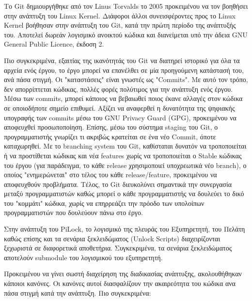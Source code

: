 		Το Git δημιουργήθηκε από τον Linus Torvalds το 2005 προκειμένου να τον βοηθήσει στην ανάπτυξη του Linux Kernel\textsuperscript{\cite{Git_History}}. Διάφοροι άλλοι συνεισφέροντες προς το Linux Kernel βοήθησαν στην ανάπτυξη του Git, κατά την πρώτη περίοδο της ανάπτυξής του. Αποτελεί δωρεάν λογισμικό ανοικτού κώδικα και διανείμεται υπό την άδεια GNU General Public Licence, έκδοση 2\textsuperscript{\cite{Git_Licence}}. 

		Πιο συγκεκριμένα, εξαιτίας της ικανότητάς του Git να διατηρεί ιστορικό για όλα τα αρχεία ενός έργου, το έργο μπορεί να επανέλθει σε μία προηγούμενη κατάστασή του, ανά πάσα στιγμή. Οι "καταστάσεις" είναι γνωστές ως "Commits". Με αυτό τον τρόπο, δεν απορρίπτεται κώδικας, πολλές φορές πολύτιμος για την ανάπτυξη ενός έργου. Μέσω των commits, μπορεί κάποιος να βεβαιωθεί ποιος έκανε αλλαγές στον κώδικα σε οποιοδήποτε σημείο επιθυμεί. Αξίζει να αναφερθεί η δυνατότητα της ψηφιακής υπογραφής των commits μέσω του GNU Privacy Guard (GPG), προκειμένου να αποφευχθεί προσωποποίηση\textsuperscript{\cite{Git_commit_assurance}}. Επίσης, μέσω του σύστημα staging του Git, ο προγραμματιστής γνωρίζει τι ακριβώς κρατείται σε ένα νέο Commit, όποτε καταχωρηθεί. Με το branching system του Git, καθίσταται δυνατόν να τροποποιείται ή να προστίθεται κώδικας και νέα features χωρίς να τροποποιείται ο Stable κώδικας του έργου (για παράδειγμα, το κάθε release χρησιμοποιεί υποχρεωτικά νέο branch), ο οποίος "ενημερώνεται" στο τέλος του κάθε release/feature, προκειμένου να αποφευχθούν προβλήματα. Τέλος, το Git διευκολύνει σημαντικά την συνεργασία μεταξύ προγραμματιστών καθώς μπορεί ο κάθε προγραμματιστής να δουλεύει το δικό του "κομμάτι" κώδικα, χωρίς να επηρρεάζει την πρόοδο των υπολοίπων προγραμματιστών που δουλεύουν πάνω στο έργο.

		Στην ανάπτυξη του PiLock, το λογισμικό της πλευράς του Εξυπηρετητή, του Πελάτη καθώς επίσης και τα σενάρια ξεκλειδώματος (Unlock Scripts) διαχειρίζονται ξεχωριστά σε διαφορετικά αποθετήρια. Συγκεκριμένα, τα σενάρια ξεκλειδώματος αποτελούν submodule του λογισμικού του εξυπηρετητή.

		Προκειμένου να γίνει σωστή διαχείρηση της διαδικασίας ανάπτυξης, ακολουθήθηκαν κάποιοι κανόνες. Οι κανόνες αυτοί διασφαλίζουν την ακαιρεότητα του κώδικα ανα πάσα στιγμή κατά την ανάπτυξη. Πιο συγκεκριμένα:

